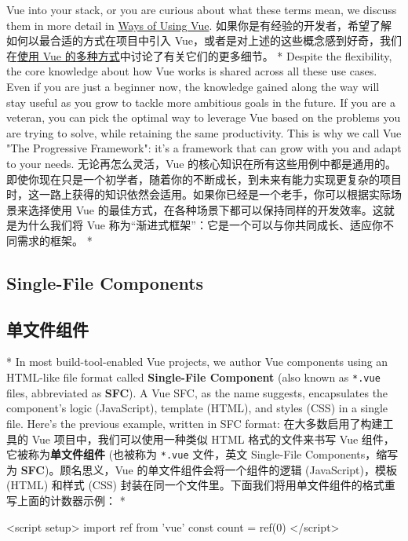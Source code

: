 \begin{paracol}{2}
Vue into your stack, or you are curious about what these terms mean, we
discuss them in more detail in
\href{https://vuejs.org/guide/extras/ways-of-using-vue}{Ways of Using
Vue}.
\switchcolumn
如果你是有经验的开发者，希望了解如何以最合适的方式在项目中引入
Vue，或者是对上述的这些概念感到好奇，我们在\href{https://cn.vuejs.org/guide/extras/ways-of-using-vue.html}{使用
Vue 的多种方式}中讨论了有关它们的更多细节。
\switchcolumn[0]*%
Despite the flexibility, the core knowledge about how Vue works is
shared across all these use cases. Even if you are just a beginner now,
the knowledge gained along the way will stay useful as you grow to
tackle more ambitious goals in the future. If you are a veteran, you can
pick the optimal way to leverage Vue based on the problems you are
trying to solve, while retaining the same productivity. This is why we
call Vue "The Progressive Framework": it's a framework that can grow
with you and adapt to your needs.
\switchcolumn
无论再怎么灵活，Vue
的核心知识在所有这些用例中都是通用的。即使你现在只是一个初学者，随着你的不断成长，到未来有能力实现更复杂的项目时，这一路上获得的知识依然会适用。如果你已经是一个老手，你可以根据实际场景来选择使用
Vue 的最佳方式，在各种场景下都可以保持同样的开发效率。这就是为什么我们将
Vue 称为``渐进式框架''：它是一个可以与你共同成长、适应你不同需求的框架。
\switchcolumn[0]*%
\subsection{Single-File Components}
\switchcolumn
\subsection{单文件组件}
\switchcolumn[0]*%
In most build-tool-enabled Vue projects, we author Vue components using
an HTML-like file format called \textbf{Single-File Component} (also
known as \texttt{*.vue} files, abbreviated as \textbf{SFC}). A Vue SFC,
as the name suggests, encapsulates the component's logic (JavaScript),
template (HTML), and styles (CSS) in a single file. Here's the previous
example, written in SFC format:
\switchcolumn
在大多数启用了构建工具的 Vue 项目中，我们可以使用一种类似 HTML
格式的文件来书写 Vue 组件，它被称为\textbf{单文件组件} (也被称为
\texttt{*.vue} 文件，英文 Single-File Components，缩写为
\textbf{SFC})。顾名思义，Vue 的单文件组件会将一个组件的逻辑
(JavaScript)，模板 (HTML) 和样式 (CSS)
封装在同一个文件里。下面我们将用单文件组件的格式重写上面的计数器示例：
\switchcolumn[0]*%
\begin{codeVue}
<script setup>
import { ref } from 'vue'
const count = ref(0)
</script>


\end{codeVue}
\end{paracol}
